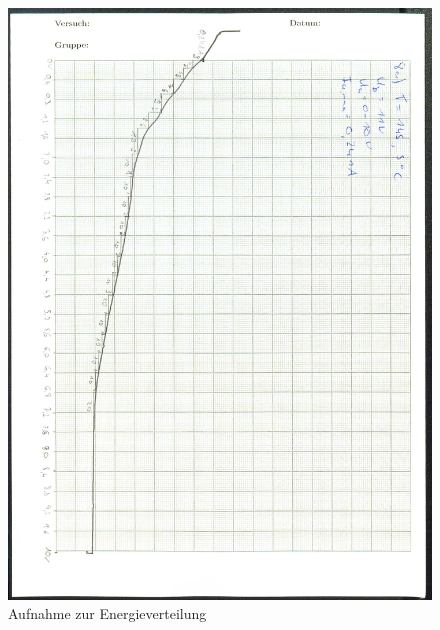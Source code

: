 \begin{figure}[p]
  \centering
  \includegraphics[width=\textwidth]{content/abKurve.jpg}
  \caption{Aufnahme zur Energieverteilung}
  \label{Bild:2}
\end{figure}
